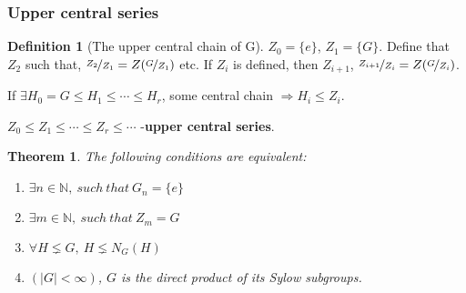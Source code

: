 \documentclass[12pt, a4paper]{article}
\newtheorem{theorem}{Theorem}[section]
\theoremstyle{definition}
\newtheorem{definition}{Definition}[section]
\begin{document}
\subsubsection{Upper central series}
\begin{definition}[The upper central chain of G]
    $Z_0 = \{e\} $, $Z_1  = \{G\}$. Define that $Z_2$ such that, $\nicefrac{Z_2}{Z_1} = 
    Z(\nicefrac{G}{Z_1})$ etc. If $Z_i$ is defined, then $Z_{i+1}$, $\nicefrac{Z_{i+1}}{Z_i}
    = Z(\nicefrac{G}{Z_i})$.
    \par
    If $ \exists H_0 = G \leqslant H_1 \leqslant \cdots \leqslant H_r$, some central chain 
    $\Rightarrow H_i \leqslant Z_i $.
    \par
    $Z_0 \leqslant Z_1 \leqslant \cdots \leqslant Z_r \leqslant \cdots $ -\textbf{upper 
    central series}.
\end{definition}
\begin{theorem}
    The following conditions are equivalent:
    \begin{enumerate}
        \item $\exists n \in \mathbb{N},\ such\ that\ G_n = \{e\} $
        \item $\exists m\in \mathbb{N},\ such\ that\ Z_m=G $
        \item $\forall H \lneq G,\ H\lneq N_G(H) $
        \item $(|G|<\infty) $, $G$ is the direct product of its Sylow subgroups.
    \end{enumerate}
\end{theorem}
\end{document}
